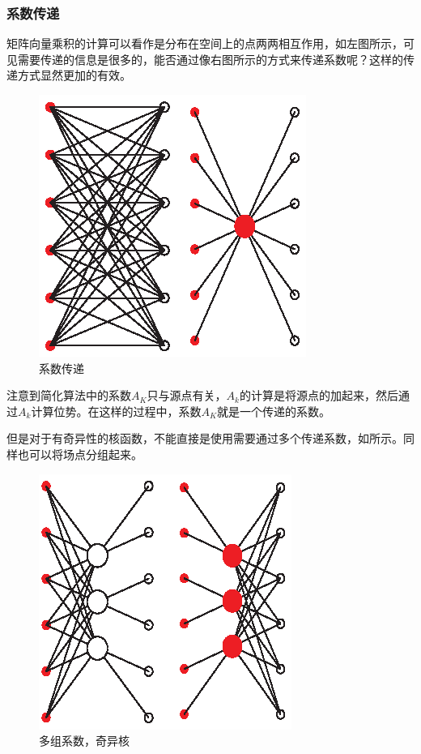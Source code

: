 \subsubsection{系数传递}
矩阵向量乘积的计算可以看作是分布在空间上的点两两相互作用，如左图所示，可见需要传递的信息是很多的，能否通过像右图所示的方式来传递系数呢？这样的传递方式显然更加的有效。
\begin{figure}[htbp]
	\begin{center}
		\includegraphics{pics/coef_passing.eps}
	\end{center}
	\caption{系数传递}
	\label{fig:coefpass}
\end{figure}
注意到简化算法中的系数$A_K$只与源点有关，$A_k$的计算是将源点的加起来，然后通过$A_k$计算位势。在这样的过程中，系数$A_K$就是一个传递的系数。

但是对于有奇异性的核函数，不能直接是使用需要通过多个传递系数，如所示。同样也可以将场点分组起来。
\begin{figure}[htbp]
	\begin{center}
		\includegraphics{pics/mulitipole.eps}
	\end{center}
	\caption{多组系数，奇异核}
	\label{fig:mulitipole}
\end{figure}

